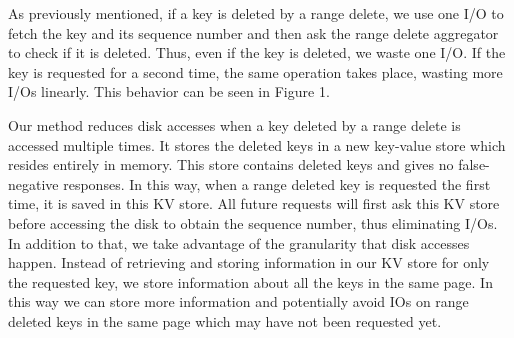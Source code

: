  As previously mentioned, if a key is deleted by a range delete, we use one I/O to fetch the key and its sequence number and then ask the range delete aggregator to check if it is deleted. 
Thus, even if the key is deleted, we waste one I/O. 
If the key is requested for a second time, the same operation takes place, wasting more I/Os linearly.
This behavior can be seen in Figure 1.

Our method reduces disk accesses when a key deleted by a range delete is accessed multiple times.
It stores the deleted keys in a new key-value store which resides entirely in memory. 
This store contains deleted keys and gives no false-negative responses.
In this way, when a range deleted key is requested the first time, it is saved in this KV store. 
All future requests will first ask this KV store before accessing the disk to obtain the sequence number, thus eliminating I/Os.
In addition to that, we take advantage of the granularity that disk accesses happen.
Instead of retrieving and storing information in our KV store for only the requested key, we store information about all the keys in the same page.
In this way we can store more information and potentially avoid IOs on range deleted keys in the same page which may have not been requested yet.

